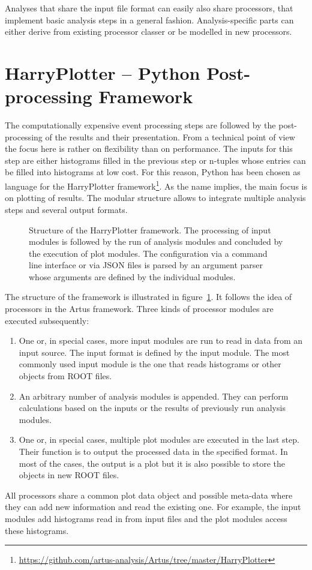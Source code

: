 \documentclass[3p]{elsarticle}
\begin{document}
Analyses that share the input file format can easily also share processors, that implement basic analysis steps in a general fashion. Analysis-specific parts can either derive from existing processor classer or be modelled in new processors.


\section{HarryPlotter -- Python Post-processing Framework \label{section_artus_harryplotter}}

The computationally expensive event processing steps are followed by the post-processing of the results and their presentation. From a technical point of view the focus here is rather on flexibility than on performance. The inputs for this step are either histograms filled in the previous step or n-tuples whose entries can be filled into histograms at low cost. For this reason, Python has been chosen as language for the HarryPlotter framework\footnote{\url{https://github.com/artus-analysis/Artus/tree/master/HarryPlotter}}. As the name implies, the main focus is on plotting of results. The modular structure allows to integrate multiple analysis steps and several output formats.

\begin{figure}[htb]
\centering 
\caption{Structure of the HarryPlotter framework. The processing of input modules is followed by the run of analysis modules and concluded by the execution of plot modules. The configuration via a command line interface or via JSON files is parsed by an argument parser whose arguments are defined by the individual modules.}
\label{figure_artus_harry_plotter}
\end{figure}

The structure of the framework is illustrated in figure~\ref{figure_artus_harry_plotter}. It follows the idea of processors in the Artus framework. Three kinds of processor modules are executed subsequently:
\begin{enumerate}
\item One or, in special cases, more input modules are run to read in data from an input source. The input format is defined by the input module. The most commonly used input module is the one that reads histograms or other objects from ROOT files.
\item An arbitrary number of analysis modules is appended. They can perform calculations based on the inputs or the results of previously run analysis modules.
\item One or, in special cases, multiple plot modules are executed in the last step. Their function is to output the processed data in the specified format. In most of the cases, the output is a plot but it is also possible to store the objects in new ROOT files.
\end{enumerate}
All processors share a common plot data object and possible meta-data where they can add new information and read the existing one. For example, the input modules add histograms read in from input files and the plot modules access these histograms.
\end{document}
